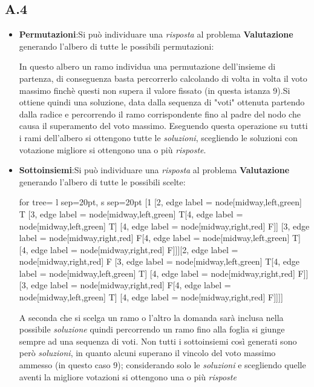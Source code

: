 \documentclass[a4paper]{article}
\begin{document}
\subsection{A.4}
\begin{itemize}
	\item \textbf{Permutazioni}:Si può individuare una \emph{risposta} al problema \textbf{Valutazione} generando l'albero di tutte le possibili permutazioni:
		\begin{center}	
		\end{center}
		In questo albero un ramo individua una permutazione dell'insieme di partenza, di conseguenza basta percorrerlo calcolando di volta in volta il voto massimo finchè questi non supera il valore fissato (in questa istanza 9).Si ottiene quindi una soluzione, data dalla sequenza di "voti" ottenuta partendo dalla radice e percorrendo il ramo corrispondente fino al padre del nodo che causa il superamento del voto massimo.
		Eseguendo questa operazione su tutti i rami dell'albero si ottengono tutte le \emph{soluzioni}, scegliendo le soluzioni con votazione migliore si ottengono una o più \emph{risposte}.
	\item \textbf{Sottoinsiemi}:Si può individuare una \emph{risposta} al problema \textbf{Valutazione} generando l'albero di tutte le possibili scelte:
		\begin{center}
			\begin{forest}
				for tree={ l sep=20pt, s sep=20pt}
			[1 [2, edge label = {node[midway,left,green] {T}} [3, edge label = {node[midway,left,green] {T}}[4, edge label = {node[midway,left,green] {T}}] [4, edge label = {node[midway,right,red] {F}}]] [3, edge label = {node[midway,right,red] {F}}[4, edge label = {node[midway,left,green] {T}}] [4, edge label = {node[midway,right,red] {F}}]]][2, edge label = {node[midway,right,red] {F}} [3, edge label = {node[midway,left,green] {T}}[4, edge label = {node[midway,left,green] {T}}] [4, edge label = {node[midway,right,red] {F}}]] [3, edge label = {node[midway,right,red] {F}}[4, edge label = {node[midway,left,green] {T}}] [4, edge label = {node[midway,right,red] {F}}]]]] 			\end{forest}
		\end{center}
		A seconda che si scelga un ramo o l'altro la domanda sarà inclusa nella possibile \emph{soluzione} quindi percorrendo un ramo fino alla foglia si giunge sempre ad una sequenza di voti.
		Non tutti i sottoinsiemi così generati sono però \emph{soluzioni}, in quanto alcuni superano il vincolo del voto massimo ammesso (in questo caso 9); considerando solo le \emph{soluzioni} e scegliendo quelle aventi la migliore votazioni si ottengono una o più \emph{risposte}
\end{itemize}
\end{document}
